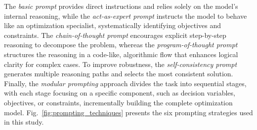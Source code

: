 \documentclass[review,12pt]{elsarticle}
\begin{document}
The \textit{basic prompt} provides direct instructions and relies solely on the model’s internal reasoning, while the \textit{act-as-expert prompt} instructs the model to behave like an optimization specialist, systematically identifying objectives and constraints. The \textit{chain-of-thought prompt} encourages explicit step-by-step reasoning to decompose the problem, whereas the \textit{program-of-thought prompt} structures the reasoning in a code-like, algorithmic flow that enhances logical clarity for complex cases. To improve robustness, the \textit{self-consistency prompt} generates multiple reasoning paths and selects the most consistent solution. Finally, the \textit{modular prompting} approach divides the task into sequential stages, with each stage focusing on a specific component, such as decision variables, objectives, or constraints, incrementally building the complete optimization model.  Fig.~\ref{fig:prompting_techniques} presents the six prompting strategies used in this study.

\end{document}
